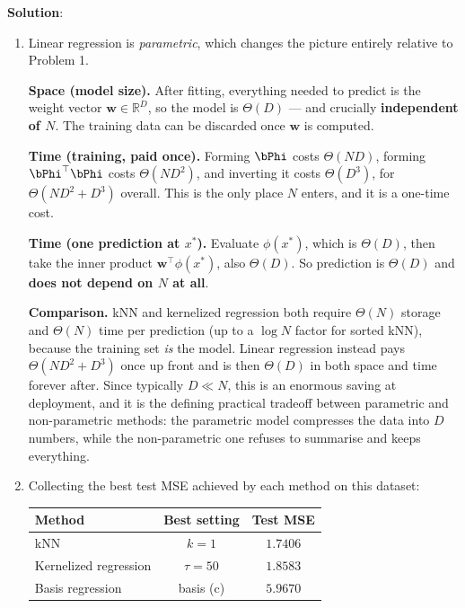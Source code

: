 \documentclass[submit]{../harvardml}
\newenvironment{solution}{
    \vspace{2mm}
    \color{blue}\noindent\textbf{Solution}:
}{}
\begin{document}
\begin{solution}
\begin{enumerate}
\textbf{Numerical stability.} The additional rescaling $f$ keeps the entries of
$\bPhi$ in a sane range. Without it, basis (a) would compute $x^9$ with
$x \approx 800$, i.e.\ values around $10^{26}$, which alongside the bias column
of ones produces a design matrix so ill-conditioned that
$\bPhi^\top\bPhi$ cannot be inverted reliably. For the trigonometric bases (c)
and (d), $f$ additionally places the data inside the periods of the individual
cosines, so that the basis functions are actually distinguishable from one
another over the observed range rather than all being evaluated on a tiny arc.

\item
Linear regression is \emph{parametric}, which changes the picture entirely
relative to Problem 1.

\textbf{Space (model size).} After fitting, everything needed to predict is the
weight vector $\mathbf w \in \mathbb{R}^D$, so the model is $\Theta(D)$ --- and
crucially \textbf{independent of $N$}. The training data can be discarded once
$\mathbf w$ is computed.

\textbf{Time (training, paid once).} Forming $\bPhi$ costs $\Theta(ND)$,
forming $\bPhi^\top\bPhi$ costs $\Theta(ND^2)$, and inverting it costs
$\Theta(D^3)$, for $\Theta(ND^2 + D^3)$ overall. This is the only place $N$
enters, and it is a one-time cost.

\textbf{Time (one prediction at $x^*$).} Evaluate $\phi(x^*)$, which is
$\Theta(D)$, then take the inner product $\mathbf w^\top \phi(x^*)$, also
$\Theta(D)$. So prediction is $\Theta(D)$ and \textbf{does not depend on $N$ at
all}.

\textbf{Comparison.} kNN and kernelized regression both require $\Theta(N)$
storage and $\Theta(N)$ time per prediction (up to a $\log N$ factor for sorted
kNN), because the training set \emph{is} the model. Linear regression instead
pays $\Theta(ND^2 + D^3)$ once up front and is then $\Theta(D)$ in both space
and time forever after. Since typically $D \ll N$, this is an enormous saving at
deployment, and it is the defining practical tradeoff between parametric and
non-parametric methods: the parametric model compresses the data into $D$
numbers, while the non-parametric one refuses to summarise and keeps everything.

\item
Collecting the best test MSE achieved by each method on this dataset:
\begin{center}
\begin{tabular}{lcc}
  \hline
  Method & Best setting & Test MSE \\
  \hline
  kNN                 & $k = 1$       & $1.7406$ \\
  Kernelized regression & $\tau = 50$ & $1.8583$ \\
  Basis regression    & basis (c)     & $5.9670$ \\
  \hline
\end{tabular}
\end{center}


\end{enumerate}
\end{solution}
\end{document}
